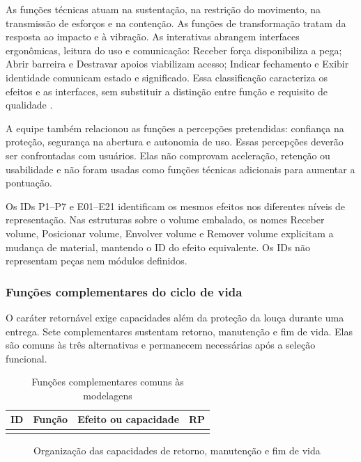 As funções técnicas atuam na sustentação, na restrição do movimento, na transmissão de esforços e na contenção. As funções de transformação tratam da resposta ao impacto e à vibração. As interativas abrangem interfaces ergonômicas, leitura do uso e comunicação: Receber força disponibiliza a pega; Abrir barreira e Destravar apoios viabilizam acesso; Indicar fechamento e Exibir identidade comunicam estado e significado. Essa classificação caracteriza os efeitos e as interfaces, sem substituir a distinção entre função e requisito de qualidade \citep{aulasmodelagem}.

A equipe também relacionou as funções a percepções pretendidas: confiança na proteção, segurança na abertura e autonomia de uso. Essas percepções deverão ser confrontadas com usuários. Elas não comprovam aceleração, retenção ou usabilidade e não foram usadas como funções técnicas adicionais para aumentar a pontuação.

Os IDs P1--P7 e E01--E21 identificam os mesmos efeitos nos diferentes níveis de representação. Nas estruturas sobre o volume embalado, os nomes Receber volume, Posicionar volume, Envolver volume e Remover volume explicitam a mudança de material, mantendo o ID do efeito equivalente. Os IDs não representam peças nem módulos definidos.

\subsubsection{Funções complementares do ciclo de vida}

O caráter retornável exige capacidades além da proteção da louça durante uma entrega. Sete complementares sustentam retorno, manutenção e fim de vida. Elas são comuns às três alternativas e permanecem necessárias após a seleção funcional.

\begin{table}[H]
\caption{Funções complementares comuns às modelagens}
\label{tab:complementares}
\centering\footnotesize
\begin{tabularx}{\textwidth}{L{0.8cm}L{3.2cm}YL{2.0cm}}
\toprule\textbf{ID}&\textbf{Função}&\textbf{Efeito ou capacidade}&\textbf{RP}\\\midrule
{}
\bottomrule\end{tabularx}
\end{table}

\begin{figure}[H]
\centering
\caption{Organização das capacidades de retorno, manutenção e fim de vida}
\label{fig:ciclo-vida-funcional}
\end{figure}

